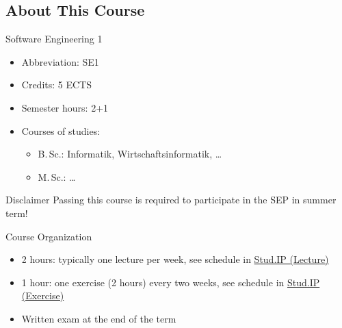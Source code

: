 \newcommand{\StudIPLectureLink}{https://studip.tu-braunschweig.de/dispatch.php/course/details?sem_id=c37620ed3e63513af37fbe31060fcf69&again=yes}
\newcommand{\StudIPExerciseLink}{https://studip.tu-braunschweig.de/dispatch.php/course/details?sem_id=c9e139ced277e63816048cb443f843fe&again=yes}
\newcommand{\StudIPLecture}{\href{\StudIPLectureLink}{Stud.IP (Lecture)}}
\newcommand{\StudIPExercise}{\href{\StudIPExerciseLink}{Stud.IP (Exercise)}}

\subsection{About This Course} 
\begin{frame}{\insertsubsection}
	\begin{fancycolumns}[widths={55}]
		\begin{definition}{Software Engineering 1}
			\begin{itemize}
				\item Abbreviation: SE1
				\item Credits: 5 ECTS %
				\item Semester hours: 2+1
				\item Courses of studies:
				\begin{itemize}
					\item B.\,Sc.: Informatik, Wirtschaftsinformatik, \ldots
					\item M.\,Sc.: \ldots
				\end{itemize}
			\end{itemize}
		\end{definition}
		\begin{note}{Disclaimer}
			Passing this course is required to participate in the SEP  in summer term!
		\end{note}
		\nextcolumn
		\begin{definition}{Course Organization}
			\begin{itemize}
				\item 2 hours: typically one lecture per week, see schedule in \StudIPLecture
				\item 1 hour: one exercise (2 hours) every two weeks, see schedule in \StudIPExercise
				\item Written exam at the end of the term
			\end{itemize}
		\end{definition}
	\end{fancycolumns}
\end{frame}

